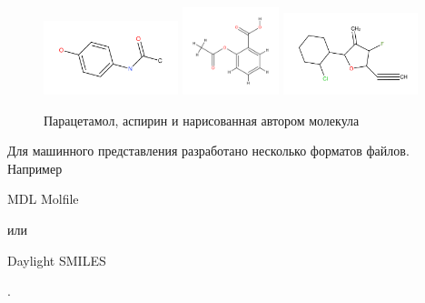 \begin{figure}[h]
\centering
{\includegraphics[width=0.35\textwidth]{img/paracetomolum.pdf}}
{\includegraphics[width=0.25\textwidth]{img/aspirine.pdf}}
{\includegraphics[width=0.35\textwidth]{img/1.pdf}}
\caption{Парацетамол, аспирин и нарисованная автором молекула}
\end{figure}

\noindent Для машинного представления разработано несколько форматов файлов. Например \begin{tt}{MDL Molfile}\end{tt} или \begin{tt}Daylight SMILES\end{tt}.

